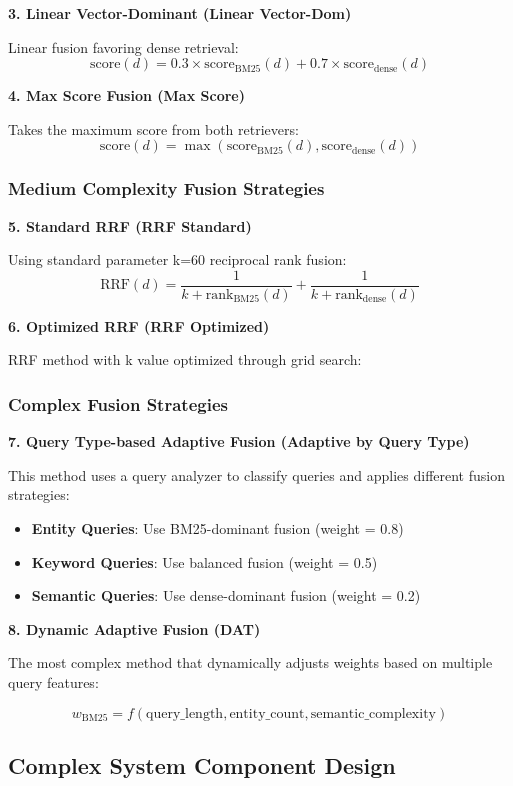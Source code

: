 \documentclass[letterpaper]{article} %
\begin{document}
\textbf{3. Linear Vector-Dominant (Linear Vector-Dom)}

Linear fusion favoring dense retrieval:
$$\text{score}(d) = 0.3 \times \text{score}_{\text{BM25}}(d) + 0.7 \times \text{score}_{\text{dense}}(d)$$

\textbf{4. Max Score Fusion (Max Score)}

Takes the maximum score from both retrievers:
$$\text{score}(d) = \max(\text{score}_{\text{BM25}}(d), \text{score}_{\text{dense}}(d))$$

\subsubsection{Medium Complexity Fusion Strategies}

\textbf{5. Standard RRF (RRF Standard)}

Using standard parameter k=60 reciprocal rank fusion:
$$\text{RRF}(d) = \frac{1}{k + \text{rank}_{\text{BM25}}(d)} + \frac{1}{k + \text{rank}_{\text{dense}}(d)}$$

\textbf{6. Optimized RRF (RRF Optimized)}

RRF method with k value optimized through grid search:

\subsubsection{Complex Fusion Strategies}

\textbf{7. Query Type-based Adaptive Fusion (Adaptive by Query Type)}

This method uses a query analyzer to classify queries and applies different fusion strategies:

\begin{itemize}
\item \textbf{Entity Queries}: Use BM25-dominant fusion (weight = 0.8)
\item \textbf{Keyword Queries}: Use balanced fusion (weight = 0.5)
\item \textbf{Semantic Queries}: Use dense-dominant fusion (weight = 0.2)
\end{itemize}

\textbf{8. Dynamic Adaptive Fusion (DAT)}

The most complex method that dynamically adjusts weights based on multiple query features:

$$w_{\text{BM25}} = f(\text{query\_length}, \text{entity\_count}, \text{semantic\_complexity})$$

\subsection{Complex System Component Design}
\end{document}
